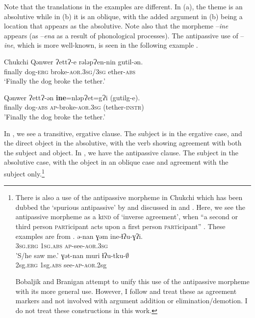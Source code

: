 \documentclass[output=paper,modfonts,nonflat,newtxmath]{langsci/langscibook}
\begin{document}
Note that the translations in the examples are different. In (a), the theme is an absolutive while in (b) it is an oblique, with the added argument in (b) being a location that appears as the absolutive. Note also that the morpheme –\textit{ine} appears (as –\textit{ena} as a result of phonological processes). The antipassive use of –\textit{ine}, which is more well-known, is seen in the following example .

    
   \ea Chukchi \citep{KozinskyEtAl1988} \label{ex:basilico:2}
    \ea \label{ex:basilico:2a}
    \gll Qǝnwer  ɁettɁ-e  rǝlǝpɁen-nin    gutil-ǝn. \\ finally  dog-\textsc{erg} 
    broke-\textsc{aor}.\textsc{3sg}/\textsc{3sg}  ether{}-\textsc{abs}\\
    \glt ‘Finally the dog broke the tether.’
    
    \ex \label{ex:basilico:2b}
    \gll Qǝnwer  ɁettɁ-ǝn  \textbf{ine}=nlǝpɁet=gɁi  (gutilg-e).\\
    finally  dog-\textsc{abs}  \textsc{ap}{}-broke-\textsc{aor}.\textsc{3sg}  (tether-\textsc{instr})\\
    \glt 'Finally the dog broke the tether.'
    \z
    \z
    
 
In , we see a transitive, ergative clause. The subject is in the ergative case, and the direct object in the absolutive, with the verb showing agreement with both the subject and object. In , we have the antipassive clause. The subject in the absolutive case, with the object in an oblique case and agreement with the subject only.\footnote{There is also a use of the antipassive morpheme in Chukchi which has been dubbed the ‘spurious antipassive’ by \citep{Hale2002} and discussed in \citep{BobaljikBranigan2006} and \citep{Bobaljik2007}. Here, we see the antipassive morpheme as a k\textsc{ind} of ‘inverse agreement’, when “a second or third person \textsc{part}icipant acts upon a first person \textsc{part}icipant” \citep{Polinsky2016}. These examples are from \citet{Polinsky2016}.
\ea \label{ex:basilico:fn}
\gll ə-nan ɣəm ine-ɬʔu-ɣʔi. \\
3\textsc{sg.\textsc{erg}} 1\textsc{sg.\textsc{abs}} \textsc{ap}-see-\textsc{\textsc{aor}}.3\textsc{sg}\\
\glt  'S/he saw me.'
\z
\ea \label{ex:basilico:fn2}
\gll ɣət-nan   muri     ɬʔu-tku-\textrm{${\emptyset}$}    \\
2\textrm{sg}.\textrm{\textsc{erg}}  1\textrm{sg.\textsc{abs}} see-\textrm{\textsc{ap}-\textsc{aor}}.2\textrm{sg}\\
\glt  
\z
	
Bobaljik and Branigan attempt to unify this use of the antipassive morpheme with its more general use. However, I follow \citet{Polinsky2016} and treat these as agreement markers and not involved with argument addition or elimination/demotion. I do not treat these constructions in this work.} 
\end{document}
